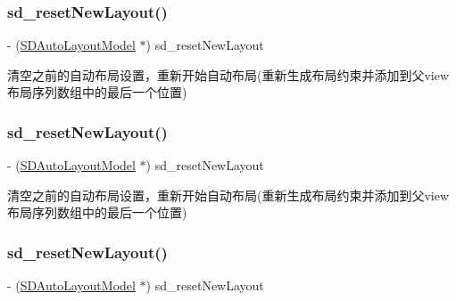 \subsubsection{\texorpdfstring{sd\+\_\+reset\+New\+Layout()}{sd\_resetNewLayout()}\hspace{0.1cm}{\footnotesize\ttfamily [1/3]}}
{\footnotesize\ttfamily -\/ (\mbox{\hyperlink{interface_s_d_auto_layout_model}{S\+D\+Auto\+Layout\+Model}} $\ast$) sd\+\_\+reset\+New\+Layout \begin{DoxyParamCaption}{ }\end{DoxyParamCaption}}

清空之前的自动布局设置，重新开始自动布局(重新生成布局约束并添加到父view布局序列数组中的最后一个位置) \mbox{\label{category_u_i_view_07_s_d_auto_layout_08_a153c9536a475a6ea852e56f7bec9c4a9}} 
\subsubsection{\texorpdfstring{sd\+\_\+reset\+New\+Layout()}{sd\_resetNewLayout()}\hspace{0.1cm}{\footnotesize\ttfamily [2/3]}}
{\footnotesize\ttfamily -\/ (\mbox{\hyperlink{interface_s_d_auto_layout_model}{S\+D\+Auto\+Layout\+Model}} $\ast$) sd\+\_\+reset\+New\+Layout \begin{DoxyParamCaption}{ }\end{DoxyParamCaption}}

清空之前的自动布局设置，重新开始自动布局(重新生成布局约束并添加到父view布局序列数组中的最后一个位置) \mbox{\label{category_u_i_view_07_s_d_auto_layout_08_a153c9536a475a6ea852e56f7bec9c4a9}} 
\subsubsection{\texorpdfstring{sd\+\_\+reset\+New\+Layout()}{sd\_resetNewLayout()}\hspace{0.1cm}{\footnotesize\ttfamily [3/3]}}
{\footnotesize\ttfamily -\/ (\mbox{\hyperlink{interface_s_d_auto_layout_model}{S\+D\+Auto\+Layout\+Model}} $\ast$) sd\+\_\+reset\+New\+Layout \begin{DoxyParamCaption}{ }\end{DoxyParamCaption}}

